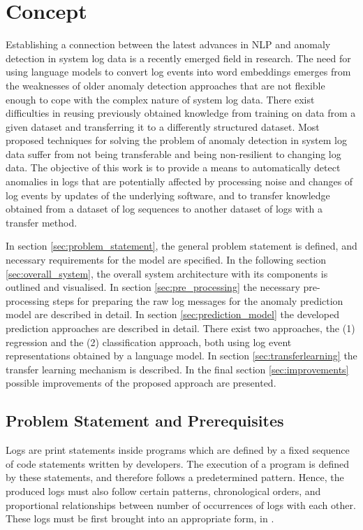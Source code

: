 \chapter{Concept \label{cha:concept}}
Establishing a connection between the latest advances in NLP and anomaly detection in system log data is a recently emerged field in research. The need for using language models to convert log events into word embeddings emerges from the weaknesses of older anomaly detection approaches that are not flexible enough to cope with the complex nature of system log data. There exist difficulties in reusing previously obtained knowledge from training on data from a given dataset and transferring it to a differently structured dataset. Most proposed techniques for solving the problem of anomaly detection in system log data suffer from not being transferable and being non-resilient to changing log data. The objective of this work is to provide a means to automatically detect anomalies in logs that are potentially affected by processing noise and changes of log events by updates of the underlying software, and to transfer knowledge obtained from a dataset of log sequences to another dataset of logs with a transfer method.

In section \ref{sec:problem_statement}, the general problem statement is defined, and necessary requirements for the model are specified. 
In the following section \ref{sec:overall_system}, the overall system architecture with its components is outlined and visualised.
In section \ref{sec:pre_processing} the necessary pre-processing steps for preparing the raw log messages for the anomaly prediction model are described in detail.
In section \ref{sec:prediction_model} the developed prediction approaches are described in detail. There exist two approaches, the (1) regression and the (2) classification approach, both using log event representations obtained by a language model.
In section \ref{sec:transferlearning} the transfer learning mechanism is described.
In the final section \ref{sec:improvements} possible improvements of the proposed approach are presented.


\section{Problem Statement and Prerequisites \label{sec:problem_statement}}
Logs are print statements inside programs which are defined by a fixed sequence of code statements written by developers. The execution of a program is defined by these statements, and therefore follows a predetermined pattern. Hence, the produced logs must also follow certain patterns, chronological orders, and proportional relationships between number of occurrences of logs with each other. These logs must be first brought into an appropriate form, in .


